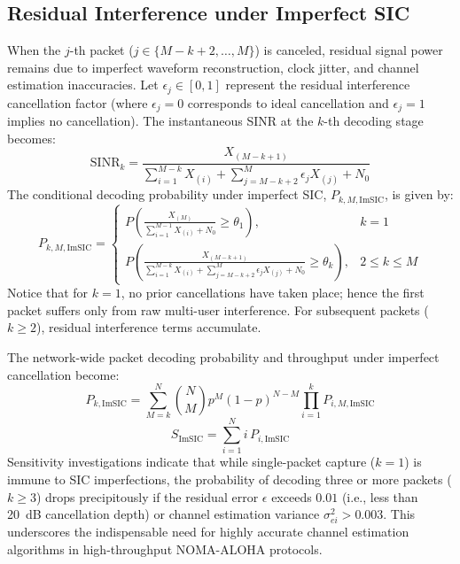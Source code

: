 \subsection{Residual Interference under Imperfect SIC}
When the $j$-th packet ($j \in \{M-k+2, \dots, M\}$) is canceled, residual signal power remains due to imperfect waveform reconstruction, clock jitter, and channel estimation inaccuracies. Let $\epsilon_j \in [0, 1]$ represent the residual interference cancellation factor (where $\epsilon_j = 0$ corresponds to ideal cancellation and $\epsilon_j = 1$ implies no cancellation). The instantaneous SINR at the $k$-th decoding stage becomes:
\begin{equation}
    \text{SINR}_k = \frac{X_{(M-k+1)}}{\sum_{i=1}^{M-k} X_{(i)} + \sum_{j=M-k+2}^M \epsilon_j X_{(j)} + N_0}
\end{equation}
The conditional decoding probability under imperfect SIC, $P_{k,M,\text{ImSIC}}$, is given by:
\begin{equation}
    P_{k,M,\text{ImSIC}} = \begin{cases}
        P\left( \frac{X_{(M)}}{\sum_{i=1}^{M-1} X_{(i)} + N_0} \ge \theta_1 \right), & k = 1 \\[1ex]
        P\left( \frac{X_{(M-k+1)}}{\sum_{i=1}^{M-k} X_{(i)} + \sum_{j=M-k+2}^M \epsilon_j X_{(j)} + N_0} \ge \theta_k \right), & 2 \le k \le M
    \end{cases}
\end{equation}
Notice that for $k = 1$, no prior cancellations have taken place; hence the first packet suffers only from raw multi-user interference. For subsequent packets ($k \ge 2$), residual interference terms accumulate.

The network-wide packet decoding probability and throughput under imperfect cancellation become:
\begin{equation}
    P_{k,\text{ImSIC}} = \sum_{M=k}^N \binom{N}{M} p^M (1 - p)^{N - M} \prod_{i=1}^k P_{i,M,\text{ImSIC}}
\end{equation}
\begin{equation}
    S_{\text{ImSIC}} = \sum_{i=1}^N i \, P_{i,\text{ImSIC}}
\end{equation}
Sensitivity investigations indicate that while single-packet capture ($k=1$) is immune to SIC imperfections, the probability of decoding three or more packets ($k \ge 3$) drops precipitously if the residual error $\epsilon$ exceeds $0.01$ (i.e., less than 20~dB cancellation depth) or channel estimation variance $\sigma_{ei}^2 > 0.003$. This underscores the indispensable need for highly accurate channel estimation algorithms in high-throughput NOMA-ALOHA protocols.

